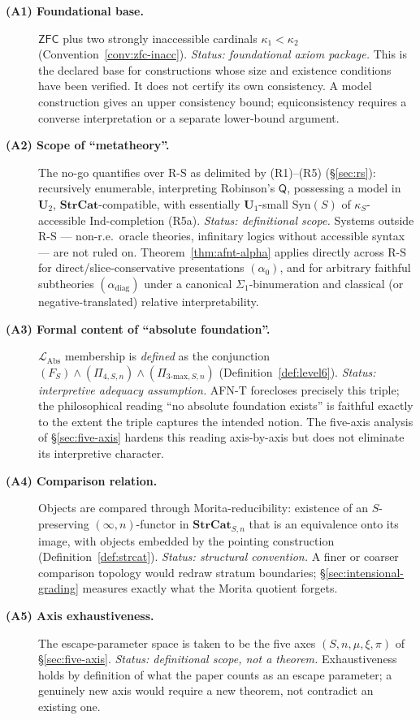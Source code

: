 \documentclass[11pt]{article}
\theoremstyle{plain}
\theoremstyle{definition}
\newcommand{\RS}{\mathrm{R\text{-}S}}
\newcommand{\LAbs}{\mathcal{L}_{\mathrm{Abs}}}
\newcommand{\Syn}{\mathrm{Syn}}
\newcommand{\ZFC}{\mathsf{ZFC}}
\begin{document}
\begin{description}
\item[\textbf{(A1) Foundational base.}] $\ZFC$ plus two strongly inaccessible cardinals $\kappa_1<\kappa_2$ (Convention~\ref{conv:zfc-inacc}). \emph{Status: foundational axiom package.} This is the declared base for constructions whose size and existence conditions have been verified. It does not certify its own consistency. A model construction gives an upper consistency bound; equiconsistency requires a converse interpretation or a separate lower-bound argument.
\item[\textbf{(A2) Scope of ``metatheory''.}] The no-go quantifies over $\RS$ as delimited by (R1)--(R5) (\S\ref{sec:rs}): recursively enumerable, interpreting Robinson's $\mathsf{Q}$, possessing a model in $\mathbf{U}_2$, $\mathbf{StrCat}$-compatible, with essentially $\mathbf{U}_1$-small $\Syn(S)$ of $\kappa_S$-accessible $\mathrm{Ind}$-completion (R5a). \emph{Status: definitional scope.} Systems outside $\RS$ --- non-r.e.\ oracle theories, infinitary logics without accessible syntax --- are not ruled on. Theorem~\ref{thm:afnt-alpha} applies directly across $\RS$ for direct/slice-conservative presentations $(\alpha_0)$, and for arbitrary faithful subtheories $(\alpha_{\mathrm{diag}})$ under a canonical $\Sigma_1$-binumeration and classical (or negative-translated) relative interpretability.
\item[\textbf{(A3) Formal content of ``absolute foundation''.}] $\LAbs$ membership is \emph{defined} as the conjunction $(F_S) \wedge (\Pi_{4, S, n}) \wedge (\Pi_{3\text{-max}, S, n})$ (Definition~\ref{def:level6}). \emph{Status: interpretive adequacy assumption.} AFN-T forecloses precisely this triple; the philosophical reading ``no absolute foundation exists'' is faithful exactly to the extent the triple captures the intended notion. The five-axis analysis of \S\ref{sec:five-axis} hardens this reading axis-by-axis but does not eliminate its interpretive character.
\item[\textbf{(A4) Comparison relation.}] Objects are compared through Morita-reducibility: existence of an $S$-preserving $(\infty, n)$-functor in $\mathbf{StrCat}_{S, n}$ that is an equivalence onto its image, with objects embedded by the pointing construction (Definition~\ref{def:strcat}). \emph{Status: structural convention.} A finer or coarser comparison topology would redraw stratum boundaries; \S\ref{sec:intensional-grading} measures exactly what the Morita quotient forgets.
\item[\textbf{(A5) Axis exhaustiveness.}] The escape-parameter space is taken to be the five axes $(S, n, \mu, \xi, \pi)$ of \S\ref{sec:five-axis}. \emph{Status: definitional scope, not a theorem.} Exhaustiveness holds by definition of what the paper counts as an escape parameter; a genuinely new axis would require a new theorem, not contradict an existing one.

\end{description}
\end{document}
